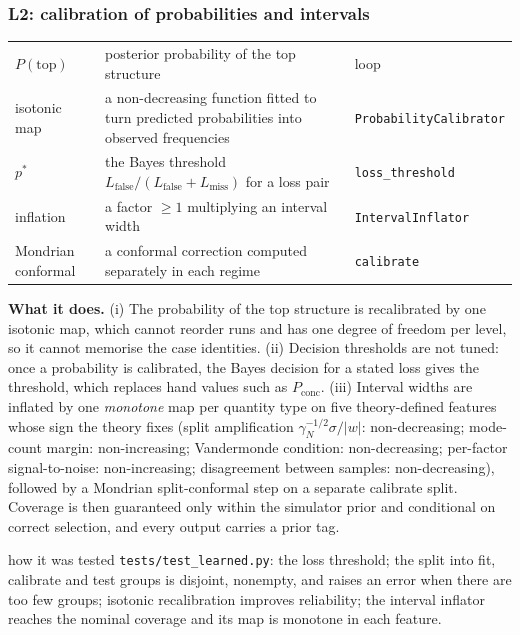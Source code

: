 \subsubsection{L2: calibration of probabilities and intervals}\label{f:sec:calib}
\begin{symbols}
\begin{tabular}{@{}L{2.6cm}L{6.0cm}L{4.3cm}@{}}
$P(\text{top})$ & posterior probability of the top structure & loop\\
isotonic map & a non-decreasing function fitted to turn predicted probabilities into observed frequencies & \texttt{ProbabilityCalibrator}\\
$p^*$ & the Bayes threshold $L_{\mathrm{false}}/(L_{\mathrm{false}}+L_{\mathrm{miss}})$ for a loss pair & \texttt{loss\_threshold}\\
inflation & a factor $\ge1$ multiplying an interval width & \texttt{IntervalInflator}\\
Mondrian conformal & a conformal correction computed separately in each regime & \texttt{calibrate}\\
\end{tabular}
\end{symbols}
\textbf{What it does.} (i) The probability of the top structure is recalibrated by one isotonic map, which cannot reorder runs and has one degree of freedom per level, so it cannot memorise the case identities. (ii) Decision thresholds are not tuned: once a probability is calibrated, the Bayes decision for a stated loss gives the threshold, which replaces hand values such as $P_{\mathrm{conc}}$. (iii) Interval widths are inflated by one \emph{monotone} map per quantity type on five theory-defined features whose sign the theory fixes (split amplification $\gamma_N^{-1/2}\sigma/|w|$: non-decreasing; mode-count margin: non-increasing; Vandermonde condition: non-decreasing; per-factor signal-to-noise: non-increasing; disagreement between samples: non-decreasing), followed by a Mondrian split-conformal step on a separate calibrate split. Coverage is then guaranteed only within the simulator prior and conditional on correct selection, and every output carries a prior tag.

\begin{explained}{how it was tested}
\texttt{tests/test\_learned.py}: the loss threshold; the split into fit, calibrate and test groups is disjoint, nonempty, and raises an error when there are too few groups; isotonic recalibration improves reliability; the interval inflator reaches the nominal coverage and its map is monotone in each feature.
\end{explained}

